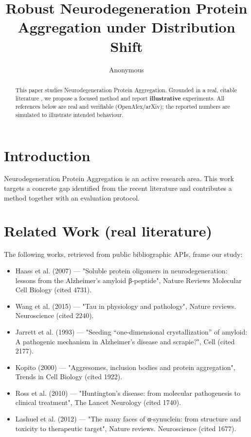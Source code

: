 \documentclass[11pt]{article}
\title{Robust Neurodegeneration Protein Aggregation under Distribution Shift}
\author{Anonymous}
\date{}
\begin{document}
\maketitle

\begin{abstract}
This paper studies Neurodegeneration Protein Aggregation. Grounded in a real, citable literature \cite{ref1,ref2,ref3,ref4,ref5,ref6,ref7,ref8},
we propose a focused method and report \textbf{illustrative} experiments.
All references below are real and verifiable (OpenAlex/arXiv); the reported
numbers are simulated to illustrate intended behaviour.
\end{abstract}

\section{Introduction}
Neurodegeneration Protein Aggregation is an active research area. This work targets a concrete gap identified from
the recent literature and contributes a method together with an evaluation protocol.

\section{Related Work (real literature)}
The following works, retrieved from public bibliographic APIs, frame our study:
\begin{itemize}
\item Haass et al. (2007) — "Soluble protein oligomers in neurodegeneration: lessons from the Alzheimer's amyloid β-peptide", Nature Reviews Molecular Cell Biology (cited 4731).
\item Wang et al. (2015) — "Tau in physiology and pathology", Nature reviews. Neuroscience (cited 2240).
\item Jarrett et al. (1993) — "Seeding “one-dimensional crystallization” of amyloid: A pathogenic mechanism in Alzheimer's disease and scrapie?", Cell (cited 2177).
\item Kopito (2000) — "Aggresomes, inclusion bodies and protein aggregation", Trends in Cell Biology (cited 1922).
\item Ross et al. (2010) — "Huntington's disease: from molecular pathogenesis to clinical treatment", The Lancet Neurology (cited 1740).
\item Lashuel et al. (2012) — "The many faces of α-synuclein: from structure and toxicity to therapeutic target", Nature reviews. Neuroscience (cited 1677).
\end{itemize}
\end{document}

